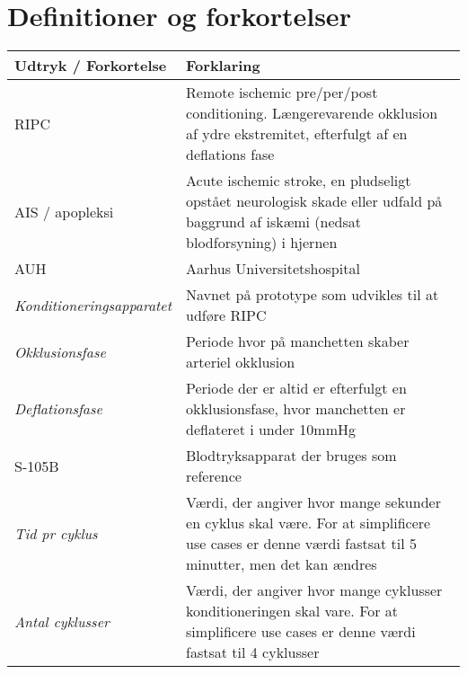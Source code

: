	\section{Definitioner og forkortelser}
	\begin{longtable}{ |p{} |p{}| } 
		\hline
		\rowcolor{usDef}
		\textbf{Udtryk / Forkortelse} &  \textbf{Forklaring} \\
		\hline
		RIPC & Remote ischemic pre/per/post conditioning. Længerevarende okklusion af ydre ekstremitet, efterfulgt af en deflations fase\\
		\hline
		AIS / apopleksi & Acute ischemic stroke, en pludseligt opstået neurologisk skade eller udfald på baggrund af iskæmi (nedsat blodforsyning) i hjernen \\
		\hline
		AUH & Aarhus Universitetshospital \\
		\hline
		\textit{Konditioneringsapparatet} & Navnet på prototype som udvikles til at udføre RIPC \\
		\hline
		\textit{Okklusionsfase} & Periode hvor på manchetten skaber arteriel okklusion \\
		\hline
		\textit{Deflationsfase} & Periode der er altid er efterfulgt en okklusionsfase, hvor manchetten er deflateret i under 10mmHg\\
		\hline
		S-105B & Blodtryksapparat der bruges som reference \\
		\hline
		\textit{Tid pr cyklus} & Værdi, der angiver hvor mange sekunder en cyklus skal være. For at simplificere use cases er denne værdi fastsat til 5 minutter, men det kan ændres \\
		\hline
		\textit{Antal cyklusser} & Værdi, der angiver hvor mange cyklusser konditioneringen skal vare. For at simplificere use cases er denne værdi fastsat til 4 cyklusser \\
		\hline
	\end{longtable}
